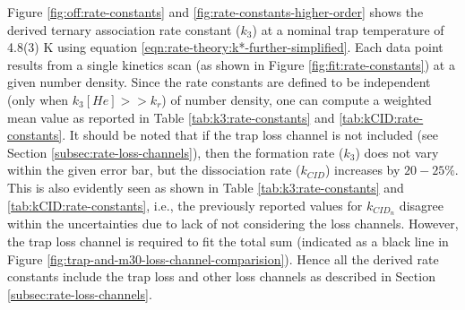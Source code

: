 Figure \ref{fig:off:rate-constants} and \ref{fig:rate-constants-higher-order}
shows the derived ternary association rate constant ($k_3$) at a nominal trap
temperature of 4.8(3) K using equation
\ref{eqn:rate-theory:k*-further-simplified}. Each data point results from a
single kinetics scan (as shown in Figure \ref{fig:fit:rate-constants}) at a
given number density. Since the rate constants are defined to be independent
(only when $k_3[He] >> k_r$) of number density, one can compute a weighted mean
value as reported in Table \ref{tab:k3:rate-constants} and
\ref{tab:kCID:rate-constants}. It should be noted that if the trap loss channel
is not included (see Section \ref{subsec:rate-loss-channels}), then the
formation rate ($k_3$) does not vary within the given error bar, but the
dissociation rate ($k_{CID}$) increases by $20-25\%$. This is also evidently
seen as shown in Table \ref{tab:k3:rate-constants} and
\ref{tab:kCID:rate-constants}, i.e., the previously reported values
\cite{Brunken2017} for $k_{CID_n}$ disagree within the uncertainties due to
lack of not considering the loss channels. However, the trap loss channel is
required to fit the total sum (indicated as a black line in Figure
\ref{fig:trap-and-m30-loss-channel-comparision}). Hence all the derived rate
constants include the trap loss and other loss channels as described in Section
\ref{subsec:rate-loss-channels}.